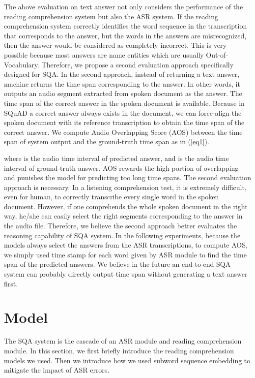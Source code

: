 \documentclass[a4paper]{article}
\begin{document}
The above evaluation on text answer not only considers the performance of the reading comprehension system but also the ASR system. 
If the reading comprehension system correctly identifies the word sequence in the transcription that corresponds to the answer, but the words in the answers are misrecognized, then the answer would be considered as completely incorrect. 
This is very possible because most answers are name entities which are usually Out-of-Vocabulary.
Therefore, we propose a second evaluation approach specifically designed for SQA.
In the second approach, instead of returning a text answer, machine returns the time span corresponding to the answer.
In other words, it outputs an audio segment extracted from spoken document as the answer. 
The time span of the correct answer in the spoken document is  available.
Because in SQuAD a correct answer always exists in the document, we can force-align the spoken document with its reference transcription to obtain the time span of the correct answer. 
We compute Audio Overlapping Score (AOS) between the  time span of system output and the ground-truth time span as in (\ref{eq1}).

where  is the audio time interval of  predicted answer, and  is the audio time interval of ground-truth answer. 
AOS rewards the high portion of overlapping and punishes the model for predicting too long time spans. 
The second evaluation approach is necessary.
In a listening comprehension test, it is extremely difficult, even for human, to correctly transcribe every single word in the spoken document. 
However, if one comprehends the whole spoken document in the right way, he/she can easily select the right segments corresponding to the answer in the audio file.
Therefore, we believe the second approach better evaluates the reasoning capability of SQA system. In the following experiments, because the models always select the answers from the ASR transcriptions, to compute AOS, we simply used time stamp for each word given by ASR module to find the time span of the predicted answers.
We believe in the future an end-to-end SQA system can probably directly output time span without generating a text answer first.




\section{Model}


The SQA system is the cascade of an ASR module and reading comprehension module. 
In this section, we first briefly introduce the reading comprehension models we used. 
Then we introduce how we used subword sequence embedding  to mitigate the impact of ASR errors.
\end{document}
